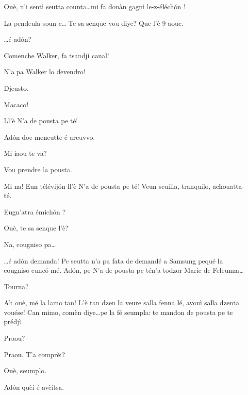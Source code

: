 \begin{drama}
\Vioupspeaks Ouè, n'i sentì seutta counta\ldots mi fa douàn  gagnì le-z-éléch\'on !



\Vioupspeaks La pendeula soun-e\ldots {} Te sa senque vou diye? Que l'è 9 aoue.

\Vioujspeaks \ldots é ad\'on?

\Vioupspeaks Comenche Walker, fa tsandjì canal! 

\Vioujspeaks N'a pa Walker lo devendro!

\Vioupspeaks Djeusto.

\Vioujspeaks Macaco!

\Vioupspeaks Ll'è \og N'a de pousta pe té\fg!


\Vioujspeaks Ad\'on doe meneutte é areuvvo.

\Vioupspeaks Mi iaou te va?

\Vioujspeaks Vou prendre la pousta.

\Vioupspeaks Mi na! Eun télévij\'on ll'è \og N'a de pousta pe té\fg! Veun seuilla, tranquilo, achouatta-té.


\Vioujspeaks Eugn'atra émich\'on ?

\Vioupspeaks Ouè, te sa senque l'è?

\Vioujspeaks Na, cougniso pa\ldots

\Vioupspeaks \ldots é ad\'on demanda! Pe seutta n'a pa fata de demandé a Samsung pequé la cougniso eunc\'o mé. Ad\'on, pe \og N'a de pousta pe té\fg n'a todzor Marie de Feleunna\ldots

\Vioujspeaks Tourna?

\Vioupspeaks Ah ouè, mé la lamo tan! L'è tan dzen la veure salla fenna lé, avouì salla dzenta vouése! Can mimo, comèn diye\ldots pe la fé seumpla: te mandon de pousta pe te prédjì.

\Vioujspeaks Praou?

\Vioupspeaks Praou. T'a comprèi?

\Vioujspeaks Ouè, seumplo.

\Vioupspeaks Ad\'on quèi é avèitsa.




\end{drama}
